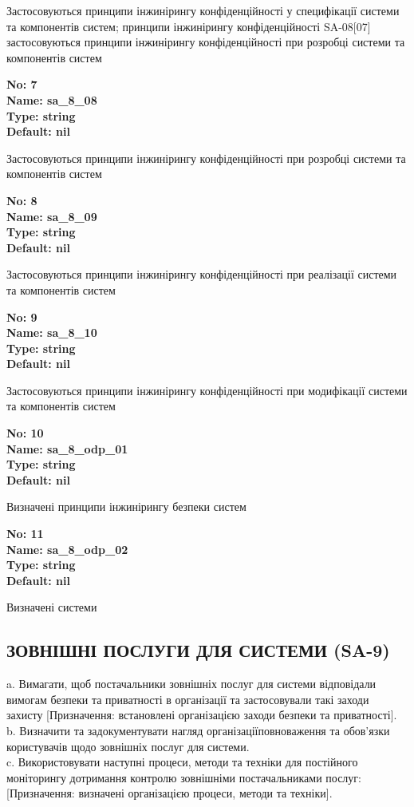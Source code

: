 \documentclass{article}
\begin{document}
{\footnotesize Застосовуються принципи інжинірингу конфіденційності у специфікації системи та компонентів систем; принципи інжинірингу конфіденційності SA-08[07] застосовуються принципи інжинірингу конфіденційності при розробці системи та компонентів систем}


{\footnotesize\bfseries
No: 7\\
Name: sa\_\allowbreak{}8\_\allowbreak{}08\\
Type: string\\
Default: nil
}

{\footnotesize Застосовуються принципи інжинірингу конфіденційності при розробці системи та компонентів систем}


{\footnotesize\bfseries
No: 8\\
Name: sa\_\allowbreak{}8\_\allowbreak{}09\\
Type: string\\
Default: nil
}

{\footnotesize Застосовуються принципи інжинірингу конфіденційності при реалізації системи та компонентів систем}


{\footnotesize\bfseries
No: 9\\
Name: sa\_\allowbreak{}8\_\allowbreak{}10\\
Type: string\\
Default: nil
}

{\footnotesize Застосовуються принципи інжинірингу конфіденційності при модифікації системи та компонентів систем}


{\footnotesize\bfseries
No: 10\\
Name: sa\_\allowbreak{}8\_\allowbreak{}odp\_\allowbreak{}01\\
Type: string\\
Default: nil
}

{\footnotesize Визначені принципи інжинірингу безпеки систем}


{\footnotesize\bfseries
No: 11\\
Name: sa\_\allowbreak{}8\_\allowbreak{}odp\_\allowbreak{}02\\
Type: string\\
Default: nil
}

{\footnotesize Визначені системи}




\subsection{ЗОВНІШНІ ПОСЛУГИ ДЛЯ СИСТЕМИ (SA-9)}
a. Вимагати, щоб постачальники зовнішніх послуг для системи відповідали вимогам безпеки та приватності в організації та застосовували такі заходи захисту [Призначення: встановлені організацією заходи безпеки та приватності].\\ 
b. Визначити та задокументувати нагляд організаціїповноваження та обов'язки користувачів щодо зовнішніх послуг для системи.\\ 
c. Використовувати наступні процеси, методи та техніки для постійного моніторингу дотримання контролю зовнішніми постачальниками послуг: [Призначення: визначені організацією процеси, методи та техніки].
\end{document}
